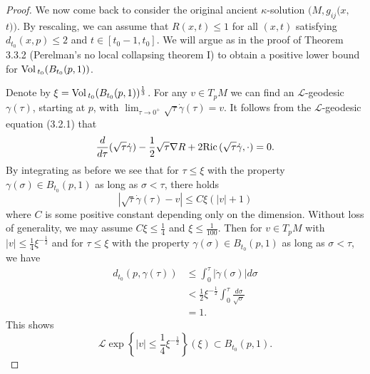 \begin{proof}
We now come back to consider the original ancient
$\kappa$-solution $(M,g_{ij}(x,$ $t))$. By rescaling, we can
assume that $R(x,t)\le 1$ for all $(x,t)$ satisfying
$d_{t_0}(x,p)\le 2$ and $t\in[t_0-1,t_0]$. We will argue as in the
proof of Theorem 3.3.2 (Perelman's no local collapsing theorem I)
to obtain a positive lower bound for ${\rm Vol}\,_{t_0}(B_{t_0}(p,1))$.

Denote by $\xi={\rm Vol}\,_{t_0}(B_{t_0}(p,1))^\frac{1}{3}$. For any
$v\in T_pM$ we can find an $\mathcal{L}$-geodesic $\gamma(\tau)$,
starting at $p$, with $\lim_{\tau\rightarrow
0^+}\sqrt{\tau}\dot{\gamma}(\tau)=v.$ It follows from the
$\mathcal{L}$-geodesic equation (3.2.1) that
$$
\frac{d}{d\tau}(\sqrt{\tau}\dot{\gamma})
-\frac{1}{2}\sqrt{\tau}\nabla
R+2{\rm Ric}\,(\sqrt{\tau}\dot{\gamma},\cdot)=0.
$$
By integrating as before we see that for $\tau\le\xi$ with the
property $\gamma(\sigma)\in B_{t_0}(p,1)$ as long as
$\sigma<\tau$, there holds
$$
|\sqrt{\tau}\dot{\gamma}(\tau)-v|\le C\xi (|v|+1)
$$
where $C$ is some positive constant depending only on the
dimension. Without loss of generality, we may assume
$C\xi\le\frac{1}{4}$ and $\xi\le\frac{1}{100}$. Then for $v\in
T_pM$ with $|v|\le\frac{1}{4}\xi^{-\frac{1}{2}}$ and for
$\tau\le\xi$ with the property $\gamma(\sigma)\in B_{t_0}(p,1)$ as
long as $\sigma<\tau$, we have
\begin{align*}
d_{t_0}(p,\gamma(\tau))
&  \le \int_0^\tau|\dot{\gamma}(\sigma)|d\sigma\\
&  < \frac{1}{2}\xi^{-\frac{1}{2}}
\int_0^\tau\frac{d\sigma}{\sqrt{\sigma}}\\
&  = 1.
\end{align*}
This shows \begin{equation}
\mathcal{L}\exp\left\{|v|\le\frac{1}{4}\xi^{-\frac{1}{2}}\right\}(\xi)
\subset B_{t_0}(p,1). %
\end{equation}


\end{proof}
